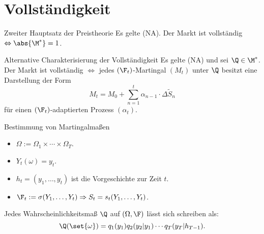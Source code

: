\section{Vollständigkeit}

\begin{karte}{Zweiter Hauptsatz der Preistheorie}
Es gelte (NA). Der Markt ist vollständig \(\Leftrightarrow \abs{\M^*} = 1\).
\end{karte}

\begin{karte}{Alternative Charakterisierung der Vollständigkeit}
Es gelte (NA) und sei \(\Q\in \M^*\). Der Markt ist vollständig \(\Leftrightarrow\)
jedes \((\F_t)\)-Martingal \((M_t)\) unter \(\Q\) besitzt eine Darstellung der Form 
\[ M_t = M_0 + \sum_{n=1}^t \alpha_{n-1} \cdot \Delta \tilde{S}_n \]
für einen \((\F_t)\)-adaptierten Prozess \((\alpha_t)\).
\end{karte}

\begin{karte}{Bestimmung von Martingalmaßen}
\begin{itemize}
    \item \(\Omega := \Omega_1 \times \cdots \times \Omega_T\).
    \item \(Y_t(\omega) = y_t\).
    \item \(h_t = (y_1, \ldots, y_t)\) ist die Vorgeschichte zur Zeit \(t\).
    \item \(\F_t := \sigma(Y_1, \ldots, Y_t) \Rightarrow S_t = s_t(Y_1, \ldots, Y_t)\).
\end{itemize}
Jedes Wahrscheinlichkeitsmaß \(\Q\) auf \((\Omega, \F)\) lässt sich schreiben als: 
\[ \Q(\set{\omega}) = q_1(y_1) q_2(y_2 | y_1) \cdots q_T(y_T | h_{T-1}). \]
\end{karte}